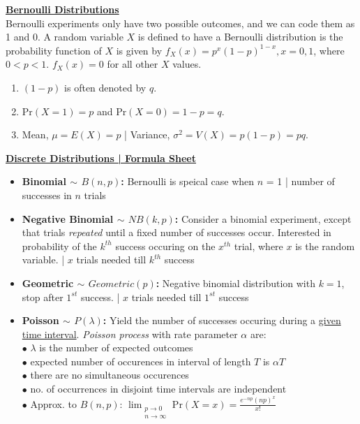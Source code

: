 \documentclass[10pt,landscape]{article}
\begin{document}
\begin{multicols*}{3}
\textbf{\underline{Bernoulli Distributions}} \\
Bernoulli experiments only have two possible outcomes, and we can code them as 1 and 0.
A random variable $X$ is defined to have a Bernoulli distribution is the probability function of $X$ is given by $f_X(x)=p^x(1-p)^{1-x},x=0,1$, where $0<p<1$. $f_X(x)=0$ for all other $X$ values.
\begin{enumerate}[topsep=0pt,noitemsep,wide=0pt, leftmargin=\dimexpr\labelwidth + 2\labelsep\relax]
    \item $(1-p)$ is often denoted by $q$. 
    \item $\text{Pr}(X=1)=p$ and $\text{Pr}(X=0)=1-p=q$.
    \item Mean, $\mu=E(X)=p$ | Variance, $\sigma^2=V(X)=p(1-p)=pq$.
\end{enumerate}

\textbf{\underline{Discrete Distributions | Formula Sheet}}
\begin{itemize}[topsep=0pt,noitemsep,wide=0pt, leftmargin=\dimexpr{} + 2\relax]
    \item \textbf{Binomial $\sim$ $B(n,p)$:} Bernoulli is speical case when $n$ = 1 | number of successes in $n$ trials
    \item \textbf{Negative Binomial $\sim$ $NB(k,p)$:} Consider a binomial experiment, except that trials \textit{repeated} until a fixed number of successes occur. Interested in probability of the $k^{th}$ success occuring on the $x^{th}$ trial, where $x$ is the random variable. | $x$ trials needed till $k^{th}$ success
    \item \textbf{Geometric $\sim$ $Geometric(p)$:} Negative binomial distribution with $k=1$, stop after $1^{st}$ success. | $x$ trials needed till $1^{st}$ success
    \item \textbf{Poisson $\sim$ $P(\lambda)$:} Yield the number of successes occuring during a \underline{given time interval}. \textit{Poisson process} with rate parameter $\alpha$ are: \\
        $\bullet$ $\lambda$ is the number of expected outcomes \\ 
        $\bullet$ expected number of occurences in interval of length $T$ is $\alpha T$ \\
        $\bullet$ there are no simultaneous occurences \\
        $\bullet$ no. of occurrences in disjoint time intervals are independent \\
        $\bullet$ Approx. to $B(n,p)$: $\lim_{\substack{p\rightarrow0\\n\rightarrow\infty}}\text{Pr}(X=x)=\frac{e^{-np}(np)^x}{x!}$
\end{itemize}


\end{multicols*}
\end{document}

